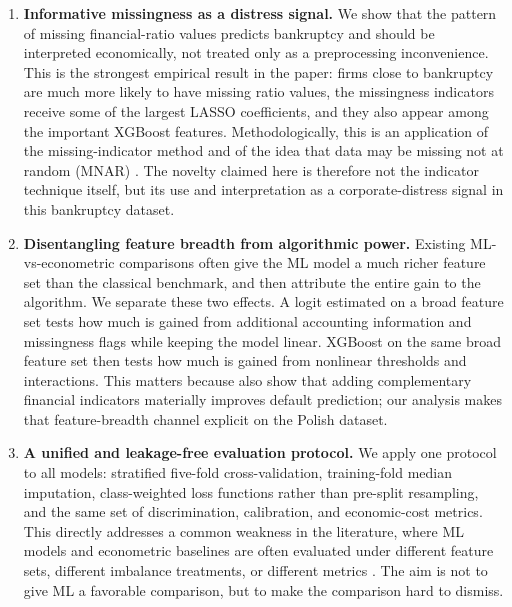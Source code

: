 \documentclass[12pt,a4paper]{article}
\begin{document}
\begin{enumerate}

\item \textbf{Informative missingness as a distress signal.} We show that the
pattern of missing financial-ratio values predicts bankruptcy and should be
interpreted economically, not treated only as a preprocessing inconvenience.
This is the strongest empirical result in the paper: firms close to bankruptcy
are much more likely to have missing ratio values, the missingness indicators
receive some of the largest LASSO coefficients, and they also appear among the
important XGBoost features. Methodologically, this is an application of the
missing-indicator method and of the idea that data may be missing not at random
(MNAR) \citep{rubin1976,jones1996,little2019}. The novelty claimed here is
therefore not the indicator technique itself, but its use and interpretation as
a corporate-distress signal in this bankruptcy dataset.

\item \textbf{Disentangling feature breadth from algorithmic power.} Existing
ML-vs-econometric comparisons often give the ML model a much richer feature set
than the classical benchmark, and then attribute the entire gain to the
algorithm. We separate these two effects. A logit estimated on a broad feature
set tests how much is gained from additional accounting information and
missingness flags while keeping the model linear. XGBoost on the same broad
feature set then tests how much is gained from nonlinear thresholds and
interactions. This matters because \cite{barboza2017} also show that adding
complementary financial indicators materially improves default prediction; our
analysis makes that feature-breadth channel explicit on the Polish dataset.

\item \textbf{A unified and leakage-free evaluation protocol.} We apply one
protocol to all models: stratified five-fold cross-validation, training-fold
median imputation, class-weighted loss functions rather than pre-split
resampling, and the same set of discrimination, calibration, and economic-cost
metrics. This directly addresses a common weakness in the literature, where ML
models and econometric baselines are often evaluated under different feature
sets, different imbalance treatments, or different metrics \citep{hand2009,
king2001}. The aim is not to give ML a favorable comparison,
but to make the comparison hard to dismiss.

\end{enumerate}
\end{document}
